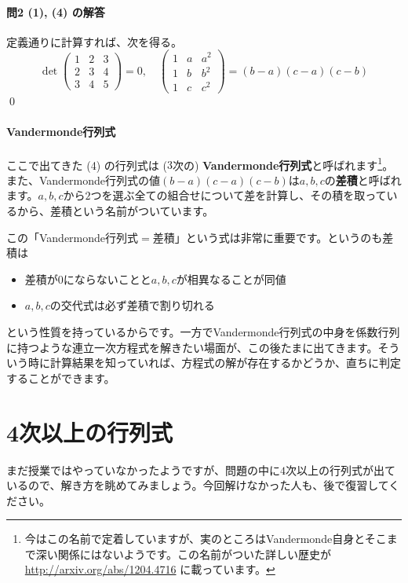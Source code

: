 \paragraph{問2 (1), (4) の解答} 定義通りに計算すれば、次を得る。
\[
\det
\begin{pmatrix}
1 & 2 & 3 \\
2 & 3 & 4 \\
3 & 4 & 5
\end{pmatrix}
= 0, \quad
\begin{pmatrix}
1 & a & a^2 \\
1 & b & b^2 \\
1 & c & c^2
\end{pmatrix}
= (b - a)(c - a)(c - b)
\]
\qed

\paragraph{Vandermonde行列式} ここで出てきた (4) の行列式は ($3$次の) \textbf{Vandermonde行列式}と呼ばれます\footnote{今はこの名前で定着していますが、実のところはVandermonde自身とそこまで深い関係にはないようです。この名前がついた詳しい歴史が \url{http://arxiv.org/abs/1204.4716} に載っています。}。また、Vandermonde行列式の値$(b - a)(c - a)(c - b)$は$a, b, c$の\textbf{差積}と呼ばれます。$a, b, c$から$2$つを選ぶ全ての組合せについて差を計算し、その積を取っているから、差積という名前がついています。

この「Vandermonde行列式$=$差積」という式は非常に重要です。というのも差積は
\begin{itemize}
\item 差積が$0$にならないことと$a, b, c$が相異なることが同値
\item $a, b, c$の交代式は必ず差積で割り切れる
\end{itemize}
という性質を持っているからです。一方でVandermonde行列式の中身を係数行列に持つような連立一次方程式を解きたい場面が、この後たまに出てきます。そういう時に計算結果を知っていれば、方程式の解が存在するかどうか、直ちに判定することができます。

\section{4次以上の行列式}

まだ授業ではやっていなかったようですが、問題の中に$4$次以上の行列式が出ているので、解き方を眺めてみましょう。今回解けなかった人も、後で復習してください。

